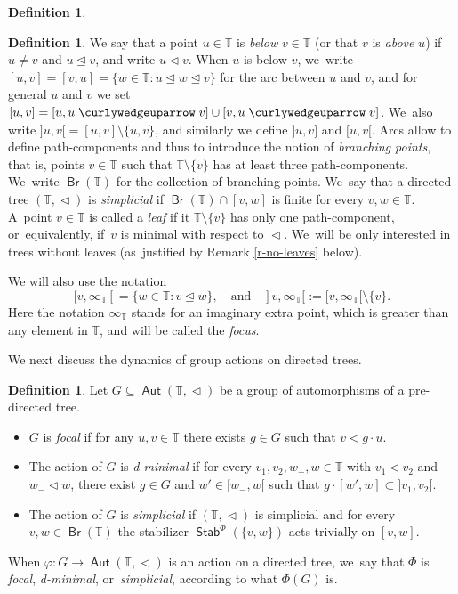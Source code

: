 \documentclass[JEP,XML,SOM,Unicode,NoFloatCountersInSection,published]{cedram}
\theoremstyle{definition}
\newtheorem{dfn}[thm]{Definition}
\DeclareMathOperator{\Aut}{\mathsf{Aut}}
\DeclareMathOperator{\Br}{\mathsf{Br}}
\DeclareMathOperator{\stab}{\mathsf{Stab}}
\newcommand{\Tbb}{\mathbb T}
\newcommand{\treeorder}{\mathrel{\triangleleft}}
\newcommand{\treeordereq}{\mathrel{\trianglelefteq}}
\newcommand{\treeup}{\mathrel{\curlywedgeuparrow}}
\begin{document}
\begin{dfn}
\begin{dfn}
We say that a point $u\in \Tbb$ is \emph{below} $v\in \Tbb$ (or that $v$ is \emph{above} $u$) if $u\neq v$ and $u\treeordereq v$, and write $u\treeorder v$. When $u$ is below $v$, we~write $[u,v]=[v,u]=\{w\in \Tbb:u\treeordereq w \treeordereq v\}$ for the arc between $u$ and $v$, and for general $u$ and $v$ we set $[u, v]=[u, u\treeup v]\cup [v, u\treeup v]$. We~also write $]u,v[{}=[u,v]\setminus \{u,v\}$, and similarly we define $]u,v]$ and $[u,v[$. Arcs allow to define path-components and thus to introduce the notion of \emph{branching points}, that is, points $v\in \Tbb$ such that $\Tbb\setminus \{v\}$ has at least three path-components. We~write $\Br(\Tbb)$ for the collection of branching points. We~say that a directed tree $(\Tbb,\treeorder)$ is \emph{simplicial} if $\Br(\Tbb)\cap [v,w]$ is finite for every $v,w\in \Tbb$. A~point $v\in \Tbb$ is called a \emph{leaf} if it $\Tbb\setminus\{v\}$ has only one path-component, or~equivalently, if~$v$ is minimal with respect to $\treeorder$. We~will be only interested in trees without leaves (as~justified by Remark \ref{r-no-leaves} below).
\end{dfn}

We will also use the notation
\[
[v, \infty_\Tbb[{}=\{w\in \Tbb: v\treeordereq w \},\quad\text{and}\quad ]v, \infty_\Tbb[{}:=[v, \infty_\Tbb[{}\setminus\{v\}.
\]
Here the notation $\infty_\Tbb$ stands for an imaginary extra point, which is greater than any element in $\Tbb$, and will be called the \emph{focus}.

We next discuss the dynamics of group actions on directed trees.

\begin{dfn}
Let $G\subseteq\Aut(\Tbb,\treeorder)$ be a group of automorphisms of a pre-directed tree.

\begin{itemize}
\item $G$ is \emph{focal} if for any $u,v\in \Tbb$ there exists $g\in G$ such that $v\treeorder g\cdot u$.
\item The action of $G$ is \emph{d-minimal} if for every $v_1, v_2,w_-,w\in\Tbb$ with $v_1\treeorder v_2$ and $w_-\treeorder w$, there exist $g\in G$ and $w'\in [w_-,w[$ such that $g\cdot [w',w]\subset]v_1,v_2[$.
\item The action of $G$ is \emph{simplicial} if $(\Tbb,\treeorder)$ is simplicial and for every $v,w\in\Br(\Tbb)$ the stabilizer $\stab^\Phi (\{v,w\})$ acts trivially on $[v,w]$.
\end{itemize}
When $\varphi\colon G\to\Aut(\Tbb,\treeorder)$ is an action on a directed tree, we~say that $\Phi$ is \emph{focal}, \emph{d-minimal}, or~\emph{simplicial}, according to what $\Phi(G)$ is.
\end{dfn}


\end{dfn}
\end{document}

